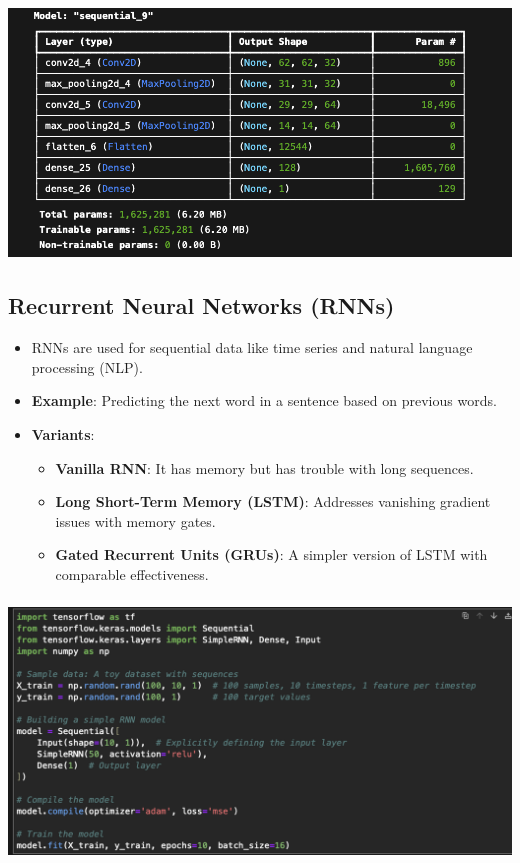 \documentclass{article}
\begin{document}
\includegraphics[width=14cm,height=6
cm]{CNN_Output.png}
\subsection{Recurrent Neural Networks (RNNs)}
\begin{itemize}
    \item RNNs are used for sequential data like time series and natural language processing (NLP).
    \item \textbf{Example}: Predicting the next word in a sentence based on previous words.
    \item \textbf{Variants}:
    \begin{itemize}
    \item \textbf{Vanilla RNN}: It has memory but has trouble with long sequences.
    \item \textbf{Long Short-Term Memory (LSTM)}: Addresses vanishing gradient issues with memory gates.
    \item \textbf{Gated Recurrent Units (GRUs)}: A simpler version of LSTM with comparable effectiveness.
    \end{itemize}
\end{itemize}

\includegraphics[width=14cm,height=7cm]{RNN.png}
\end{document}
